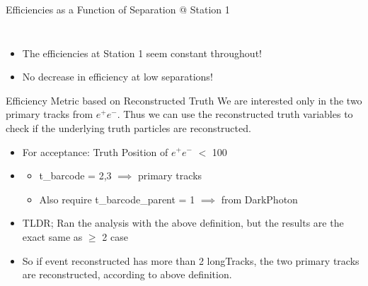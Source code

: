\begin{frame}{Efficiencies as a Function of Separation @ Station 1}
\begin{columns}
\begin{column}{0.6\linewidth}
\begin{figure}
            \end{figure}
        \end{column}
    \end{columns}
    \begin{itemize}
        \item The efficiencies at Station 1 seem constant throughout!
        \item No decrease in efficiency at low separations!
    \end{itemize}
\end{frame}




\begin{frame}{Efficiency Metric based on Reconstructed Truth}
    We are interested only in the two primary tracks from $e^+e^-$. Thus we can use the reconstructed truth variables to check if the underlying truth particles are reconstructed.
    \begin{itemize}
        \item For acceptance: Truth Position of $e^+e^-$ $<$ 100
        \item {}
        \begin{itemize}
            \item t\_barcode = 2,3 $\implies$ primary tracks 
            \item Also require t\_barcode\_parent = 1 $\implies$ from DarkPhoton

        \end{itemize}
        \item TLDR; Ran the analysis with the above definition, but the results are the exact same as $\geq$ 2 case 
        \item So if event reconstructed has more than 2 longTracks, the two primary tracks are reconstructed, according to above definition.
    \end{itemize}
\end{frame}



